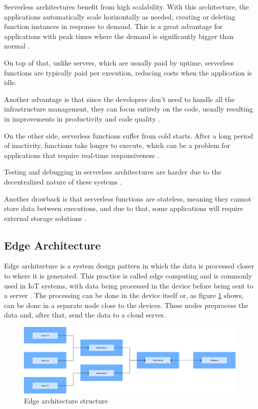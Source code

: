 Serverless architectures benefit from high scalability. With this
architecture, the applications automatically scale horizontally as needed, creating or
deleting function instances in response to demand. This is a great
advantage for applications with peak times where the demand is
significantly bigger than normal \cite{GoogleServerless}.

On top of that, unlike servers, which are usually paid by uptime, serverless functions are
typically paid per execution, reducing costs when the application is idle.

Another advantage is that since the developers don't need to handle all the infrastructure management,
they can focus entirely on the code, usually resulting in improvements in
productivity and code quality \cite{GoogleServerless}.

On the other side, serverless functions suffer from cold starts. After a long
period of inactivity, functions take longer to execute, which
can be a problem for applications that require real-time responsiveness \cite{s21030928}.

Testing and debugging in serverless architectures are harder due to the
decentralized nature of these systems \cite{meghla2023testing}.

Another drawback is that serverless functions are stateless, meaning they
cannot store data between executions, and due to that, some
applications will require external storage solutions \cite{meghla2023testing}.

\subsection{Edge Architecture}
Edge architecture is a system design pattern in which the data is processed
closer to where it is generated. This practice is called edge computing and
is commonly used in \gls{IoT} systems, with data being processed in the device
before being sent to a server \cite{s20226441}.
The processing can be done in the device itself or, as figure \ref{fig:architectures:edge}
shows, can be done in a separate node close to the devices. These nodes
preprocess the data and, after that, send the data to a cloud server.

\begin{figure}[H]
	\centering
	\includegraphics[width=\textwidth, height=0.5\textheight, keepaspectratio]{Chapters/Figures/Architectures/Edge.pdf}
	\caption{Edge architecture structure}
	\label{fig:architectures:edge}
\end{figure}

